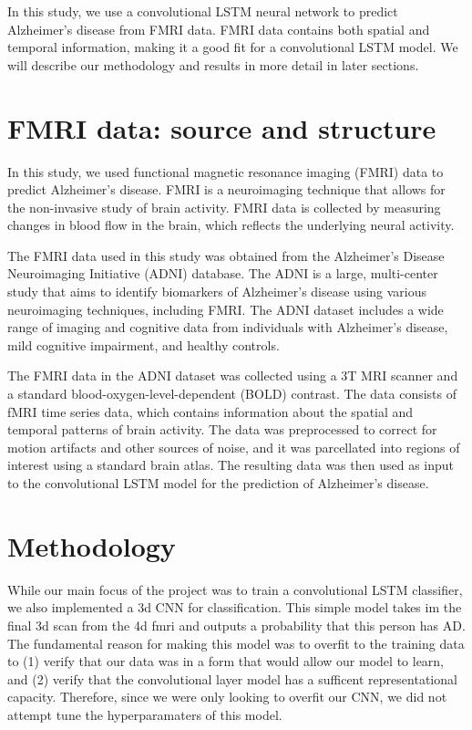 \documentclass[10pt]{article}
\begin{document}
	In this study, we use a convolutional LSTM neural network to predict Alzheimer's disease from FMRI data. FMRI data contains both spatial and temporal information, making it a good fit for a convolutional LSTM model. We will describe our methodology and results in more detail in later sections.

	\section{FMRI data: source and structure}

	In this study, we used functional magnetic resonance imaging (FMRI) data to predict Alzheimer's disease. FMRI is a neuroimaging technique that allows for the non-invasive study of brain activity. FMRI data is collected by measuring changes in blood flow in the brain, which reflects the underlying neural activity.

	The FMRI data used in this study was obtained from the Alzheimer's Disease Neuroimaging Initiative (ADNI) database. The ADNI is a large, multi-center study that aims to identify biomarkers of Alzheimer's disease using various neuroimaging techniques, including FMRI. The ADNI dataset includes a wide range of imaging and cognitive data from individuals with Alzheimer's disease, mild cognitive impairment, and healthy controls.

	The FMRI data in the ADNI dataset was collected using a 3T MRI scanner and a standard blood-oxygen-level-dependent (BOLD) contrast. The data consists of fMRI time series data, which contains information about the spatial and temporal patterns of brain activity. The data was preprocessed to correct for motion artifacts and other sources of noise, and it was parcellated into regions of interest using a standard brain atlas. The resulting data was then used as input to the convolutional LSTM model for the prediction of Alzheimer's disease.

	\section{Methodology}

	While our main focus of the project was to train a convolutional LSTM classifier, we also implemented a 3d CNN for classification. This simple model takes im the final 3d scan from the 4d fmri and outputs a probability that this person has AD. The fundamental reason for making this model was to overfit to the training data to (1) verify that our data was in a form that would allow our model to learn, and (2) verify that the convolutional layer model has a sufficent representational capacity. Therefore, since we were only looking to overfit our CNN, we did not attempt tune the hyperparamaters of this model. 
	
\end{document}
